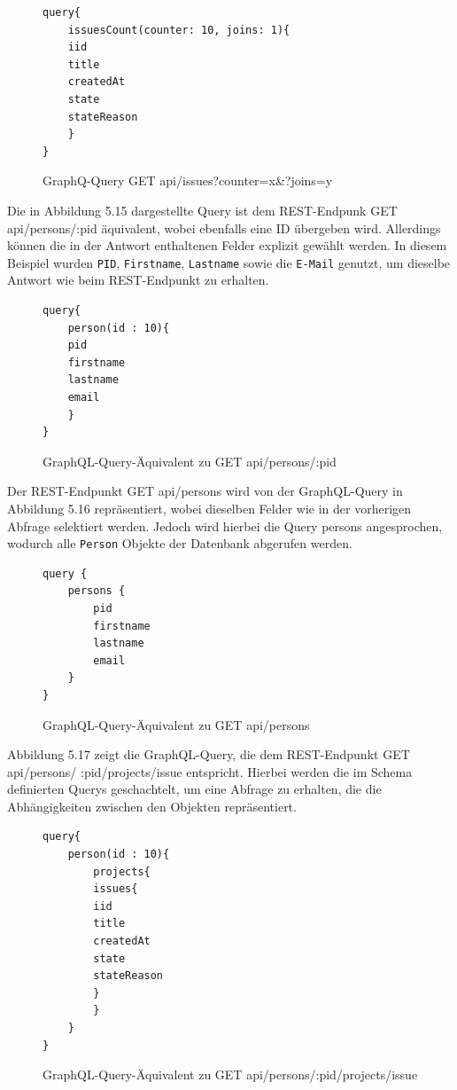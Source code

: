 \begin{figure}[H]
\begin{center}
\begin{BVerbatim}
query{
    issuesCount(counter: 10, joins: 1){
	iid
	title 
	createdAt 
	state 
	stateReason
    }
}
\end{BVerbatim}
\end{center}
\caption{GraphQ-Query GET api/issues?counter=x\&?joins=y}
\end{figure}
\noindent
Die in Abbildung 5.15 dargestellte Query ist dem REST-Endpunk \colorbox{gray!20}{GET api/persons/:pid} äquivalent, wobei ebenfalls eine ID übergeben wird. Allerdings können die in der Antwort enthaltenen Felder explizit gewählt werden. In diesem Beispiel wurden \texttt{PID},  \texttt{Firstname},  \texttt{Lastname} sowie die  \texttt{E-Mail} genutzt, um dieselbe Antwort wie beim REST-Endpunkt zu erhalten.
\begin{figure}[H]
\begin{center}
\begin{BVerbatim}
query{
    person(id : 10){
	pid
	firstname
	lastname
	email
    }
}
\end{BVerbatim}
\end{center}
\caption{GraphQL-Query-Äquivalent zu GET api/persons/:pid}
\end{figure}
\noindent
Der REST-Endpunkt \colorbox{gray!20}{GET api/persons} wird von der GraphQL-Query in Abbildung 5.16 repräsentiert, wobei dieselben Felder wie in der vorherigen Abfrage selektiert werden. Jedoch wird hierbei die Query \colorbox{gray!20}{persons} angesprochen, wodurch alle  \texttt{Person} Objekte der Datenbank abgerufen werden.
\begin{figure}[H]
\begin{center}
\begin{BVerbatim}
query {
    persons {
        pid
        firstname
        lastname
        email
    }
}
\end{BVerbatim}
\end{center}
\caption{GraphQL-Query-Äquivalent zu GET api/persons}
\end{figure}
\noindent
Abbildung 5.17 zeigt die GraphQL-Query, die dem REST-Endpunkt \colorbox{gray!20}{GET api/persons/} \colorbox{gray!20}{:pid/projects/issue} entspricht. Hierbei werden die im Schema definierten Querys geschachtelt, um eine Abfrage zu erhalten, die die Abhängigkeiten zwischen den Objekten repräsentiert.
\begin{figure}[H]
\begin{center}
\begin{BVerbatim}
query{
    person(id : 10){
        projects{
	    issues{
		iid
		title
		createdAt
		state
		stateReason
	    }
        }
    }
}
\end{BVerbatim}
\end{center}
\caption{GraphQL-Query-Äquivalent zu GET api/persons/:pid/projects/issue}
\end{figure}

